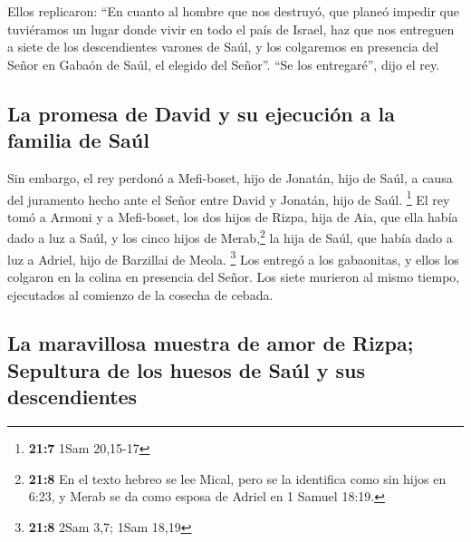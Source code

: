  Ellos replicaron: ``En cuanto al hombre que nos destruyó,
que planeó impedir que tuviéramos un lugar donde vivir en todo el país
de Israel,  haz que nos entreguen a siete de los
descendientes varones de Saúl, y los colgaremos en presencia del Señor
en Gabaón de Saúl, el elegido del Señor''. ``Se los entregaré'', dijo el
rey.

\hypertarget{la-promesa-de-david-y-su-ejecuciuxf3n-a-la-familia-de-sauxfal}{%
\subsection{La promesa de David y su ejecución a la familia de
Saúl}\label{la-promesa-de-david-y-su-ejecuciuxf3n-a-la-familia-de-sauxfal}}

 Sin embargo, el rey perdonó a Mefi-boset, hijo de
Jonatán, hijo de Saúl, a causa del juramento hecho ante el Señor entre
David y Jonatán, hijo de Saúl. \footnote{\textbf{21:7} 1Sam 20,15-17}
 El rey tomó a Armoni y a Mefi-boset, los dos hijos de
Rizpa, hija de Aia, que ella había dado a luz a Saúl, y los cinco hijos
de Merab,\footnote{\textbf{21:8} En el texto hebreo se lee Mical, pero
  se la identifica como sin hijos en 6:23, y Merab se da como esposa de
  Adriel en 1 Samuel 18:19.} la hija de Saúl, que había dado a luz a
Adriel, hijo de Barzillai de Meola. \footnote{\textbf{21:8} 2Sam 3,7;
  1Sam 18,19}  Los entregó a los gabaonitas, y ellos los
colgaron en la colina en presencia del Señor. Los siete murieron al
mismo tiempo, ejecutados al comienzo de la cosecha de cebada.

\hypertarget{la-maravillosa-muestra-de-amor-de-rizpa-sepultura-de-los-huesos-de-sauxfal-y-sus-descendientes}{%
\subsection{La maravillosa muestra de amor de Rizpa; Sepultura de los
huesos de Saúl y sus
descendientes}\label{la-maravillosa-muestra-de-amor-de-rizpa-sepultura-de-los-huesos-de-sauxfal-y-sus-descendientes}}


